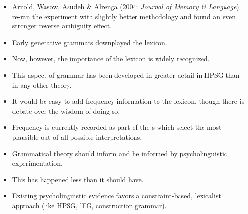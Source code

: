 \documentclass[a4paper,landscape,headrule,footrule]{foils}
\begin{document}

\begin{center}
  \begin{bchart}[max=100,step=25,unit=\%,scale=2.2]
    \smallskip
  \end{bchart}
\end{center}

\begin{itemize}
\item Arnold, Wasow, Asudeh \& Alrenga (2004:
\textit{Journal of Memory \& Language})
re-ran the experiment with slightly better 
methodology and found an even stronger reverse 
ambiguity effect.
\end{itemize}



\begin{itemize}
\item Early generative grammars downplayed the lexicon.
\item Now, however, the importance of the lexicon is widely 
recognized.
\item This aspect of grammar has been developed in greater 
detail in HPSG than in any other theory.
\item It would be easy to add frequency information to the
lexicon, though there is debate over the wisdom of 
doing so.
\item Frequency is currently recorded as part of the s which select the most plausible out of all
  possible interpretations.
\end{itemize}



\begin{itemize}
\item Grammatical theory should inform and be informed 
by psycholinguistic experimentation.
\item This has happened less than it should have.
\item Existing psycholinguistic evidence favors a 
constraint-based, lexicalist approach (like HPSG, lFG, construction grammar).
\end{itemize}
\end{document}
